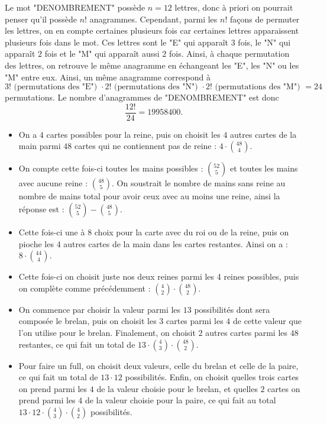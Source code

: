 \begin{sol}
Le mot "DENOMBREMENT" possède $n=12$ lettres, donc à priori on pourrait penser qu'il possède $n!$ anagrammes. Cependant, parmi les $n!$ façons de permuter les lettres, on en compte certaines plusieurs fois car certaines lettres apparaissent plusieurs fois dans le mot. Ces lettres sont le "E" qui apparaît $3$ fois, le "N" qui apparaît $2$ fois et le "M" qui apparaît aussi $2$ fois. Ainsi, à chaque permutation des lettres, on retrouve le même anagramme en échangeant les "E", les "N" ou les "M" entre eux. Ainsi, un même anagramme correspond à
$$3!\text{ (permutations des "E") }\cdot 2!\text{ (permutations des "N") }\cdot 2!\text{ (permutations des "M") }=24$$
permutations. Le nombre d'anagrammes de "DENOMBREMENT" est donc
$$\frac{12!}{24}=19958400.$$
\end{sol}

\begin{sol}
\begin{itemize}
    \item On a $4$ cartes possibles pour la reine, puis on choisit les $4$ autres cartes de la main parmi $48$ cartes qui ne contiennent pas de reine : $4 \cdot \binom{48}{4}$.
    \item On compte cette fois-ci toutes les mains possibles : $\binom{52}{5}$ et toutes les mains avec aucune reine : $\binom{48}{5}$. On soustrait le nombre de mains sans reine au nombre de mains total pour avoir ceux avec au moins une reine, ainsi la réponse est : $\binom{52}{5} - \binom{48}{5}$.
    \item Cette fois-ci une à $8$ choix pour la carte avec du roi ou de la reine, puis on pioche les $4$ autres cartes de la main dans les cartes restantes. Ainsi on a : $8 \cdot \binom{44}{4}$.
    \item Cette fois-ci on choisit juste nos deux reines parmi les 4 reines possibles, puis on complète comme précédemment : $\binom{4}{2} \cdot \binom{48}{2}$.
    \item On commence par choisir la valeur parmi les $13$ possibilités dont sera composée le brelan, puis on choisit les $3$ cartes parmi les $4$ de cette valeur que l'on utilise pour le brelan. Finalement, on choisit $2$ autres cartes parmi les $48$ restantes, ce qui fait un total de $13\cdot \binom43\cdot\binom{48}2$.
    \item Pour faire un full, on choisit deux valeurs, celle du brelan et celle de la paire, ce qui fait un total de $13\cdot 12$ possibilités. Enfin, on choisit quelles trois cartes on prend parmi les $4$ de la valeur choisie pour le brelan, et quelles $2$ cartes on prend parmi les $4$ de la valeur choisie pour la paire, ce qui fait au total $13\cdot 12\cdot \binom 43\cdot\binom 42$ possibilités.

\end{itemize}
\end{sol}


